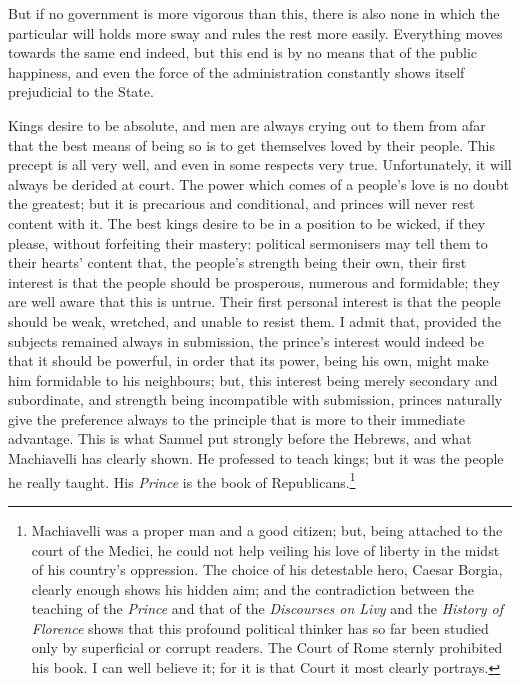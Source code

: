 \documentclass[12pt]{report}
\begin{document}
But if no government is more vigorous than this, there is also none in which the particular will holds more sway and rules the rest more easily. Everything moves towards the same end indeed, but this end is by no means that of the public happiness, and even the force of the administration constantly shows itself prejudicial to the State.

Kings desire to be absolute, and men are always crying out to them from afar that the best means of being so is to get themselves loved by their people. This precept is all very well, and even in some respects very true. Unfortunately, it will always be derided at court. The power which comes of a people's love is no doubt the greatest; but it is precarious and conditional, and princes will never rest content with it. The best kings desire to be in a position to be wicked, if they please, without forfeiting their mastery: political sermonisers may tell them to their hearts' content that, the people's strength being their own, their first interest is that the people should be prosperous, numerous and formidable; they are well aware that this is untrue. Their first personal interest is that the people should be weak, wretched, and unable to resist them. I admit that, provided the subjects remained always in submission, the prince's interest would indeed be that it should be powerful, in order that its power, being his own, might make him formidable to his neighbours; but, this interest being merely secondary and subordinate, and strength being incompatible with submission, princes naturally give the preference always to the principle that is more to their immediate advantage. This is what Samuel put strongly before the Hebrews, and what Machiavelli has clearly shown. He professed to teach kings; but it was the people he really taught. His \textit{Prince} is the book of Republicans.\footnote{Machiavelli was a proper man and a good citizen; but, being attached to the court of the Medici, he could not help veiling his love of liberty in the midst of his country's oppression. The choice of his detestable hero, Caesar Borgia, clearly enough shows his hidden aim; and the contradiction between the teaching of the \textit{Prince} and that of the \textit{Discourses on Livy} and the \textit{History of Florence} shows that this profound political thinker has so far been studied only by superficial or corrupt readers. The Court of Rome sternly prohibited his book. I can well believe it; for it is that Court it most clearly portrays.}
\end{document}
